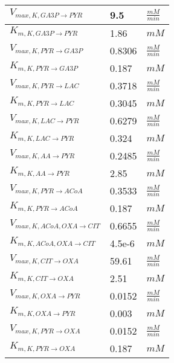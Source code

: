 \begin{supertabular}{lll}
$V_{max, K,GA3P \xrightarrow[]{} PYR}$ & 9.5 & $\frac{mM}{min}$       \\ \hline
$K_{m, K,GA3P \xrightarrow[]{} PYR}$ & 1.86 & $mM$   \\ \hline

$V_{max, K,PYR \xrightarrow[]{} GA3P}$ & 0.8306 & $\frac{mM}{min}$       \\ \hline
$K_{m, K,PYR \xrightarrow[]{} GA3P}$ & 0.187 & $mM$   \\ \hline

$V_{max, K,PYR \xrightarrow[]{} LAC}$ & 0.3718 & $\frac{mM}{min}$       \\ \hline
$K_{m, K,PYR \xrightarrow[]{} LAC}$ & 0.3045 & $mM$   \\ \hline

$V_{max, K,LAC \xrightarrow[]{} PYR}$ & 0.6279 & $\frac{mM}{min}$       \\ \hline
$K_{m, K,LAC \xrightarrow[]{} PYR}$ & 0.324 & $mM$   \\ \hline

$V_{max, K,AA \xrightarrow[]{} PYR}$ & 0.2485 & $\frac{mM}{min}$       \\ \hline
$K_{m, K,AA \xrightarrow[]{} PYR}$ & 2.85 & $mM$   \\ \hline

$V_{max, K,PYR \xrightarrow[]{} ACoA}$ & 0.3533 & $\frac{mM}{min}$       \\ \hline
$K_{m, K,PYR \xrightarrow[]{} ACoA}$ & 0.187 & $mM$   \\ \hline

$V_{max, K,ACoA , OXA \xrightarrow[]{} CIT}$ & 0.6655 & $\frac{mM}{min}$       \\ \hline
$K_{m, K,ACoA , OXA \xrightarrow[]{} CIT}$ & 4.5e-6 & $mM$   \\ \hline

$V_{max, K,CIT \xrightarrow[]{} OXA}$ & 59.61 & $\frac{mM}{min}$       \\ \hline
$K_{m, K,CIT \xrightarrow[]{} OXA}$ & 2.51 & $mM$   \\ \hline

$V_{max, K,OXA \xrightarrow[]{} PYR}$ & 0.0152 & $\frac{mM}{min}$       \\ \hline
$K_{m, K,OXA \xrightarrow[]{} PYR}$ & 0.003 & $mM$   \\ \hline

$V_{max, K,PYR \xrightarrow[]{} OXA}$ & 0.0152 & $\frac{mM}{min}$       \\ \hline
$K_{m, K,PYR \xrightarrow[]{} OXA}$ & 0.187 & $mM$   \\ \hline


\end{supertabular}
